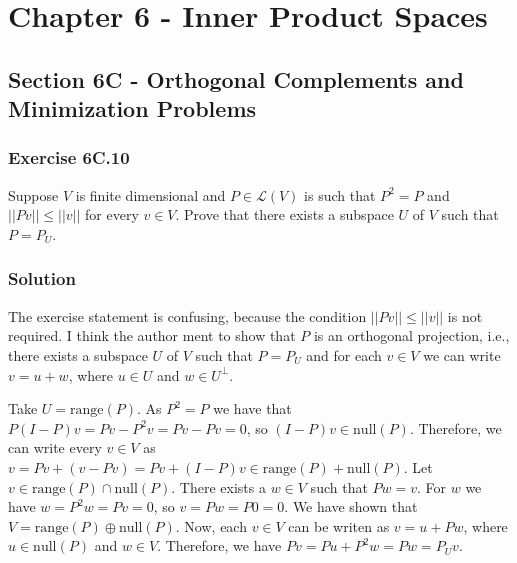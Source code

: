 \section*{Chapter 6 - Inner Product Spaces}

\subsection*{Section 6C - Orthogonal Complements and Minimization Problems}

\subsubsection*{Exercise 6C.10}

Suppose $V$ is finite dimensional and $P \in \mathcal{L}(V)$ is such that $P^2 = P$ and $||Pv|| \leq ||v||$ for every $v \in V$.
Prove that there exists a subspace $U$ of $V$ such that $P = P_U$.

\subsubsection*{Solution}

The exercise statement is confusing, because the condition $||Pv|| \leq ||v||$ is not required.
I think the author ment to show that $P$ is an orthogonal projection, i.e., there exists a subspace $U$ of $V$ such that $P = P_U$ and for each $v \in V$ we can write $v = u + w$, where $u \in U$ and $w \in U^{\perp}$.

Take $U = \mathrm{range}(P)$.
As $P^2 = P$ we have that $P(I-P)v = Pv - P^2v = Pv - Pv = 0$, so $(I - P)v \in \mathrm{null}(P)$.
Therefore, we can write every $v \in V$ as $v = Pv + (v - Pv) = Pv + (I - P)v \in \mathrm{range}(P) + \mathrm{null}(P)$.
Let $v \in \mathrm{range}(P) \cap \mathrm{null}(P)$.
There exists a $w \in V$ such that $Pw = v$.
For $w$ we have $w = P^2 w = Pv = 0$, so $v = Pw = P0 = 0$.
We have shown that $V = \mathrm{range}(P) \oplus \mathrm{null}(P)$.
Now, each $v \in V$ can be writen as $v = u + Pw$, where $u \in \mathrm{null}(P)$ and $w \in V$.
Therefore, we have $Pv = Pu + P^2w = Pw = P_{U}v$.

